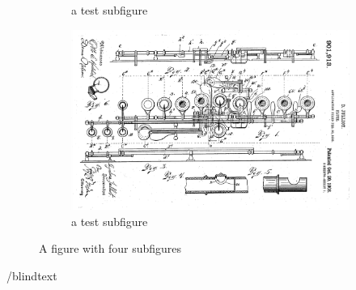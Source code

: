 \begin{figure}[!htbp]
{\begin{subfigure}[b]{.6\textwidth}
			\caption{a test subfigure}
		\end{subfigure}%
		\begin{subfigure}[b]{.6\textwidth}
			\centering
			\includegraphics[width=.95\textwidth]{gfx/06_visual_representation/Julliot_patent.png}
			\caption{a test subfigure}
		\end{subfigure}%
	}
	\caption{A figure with four subfigures}
\end{figure}

/blindtext

